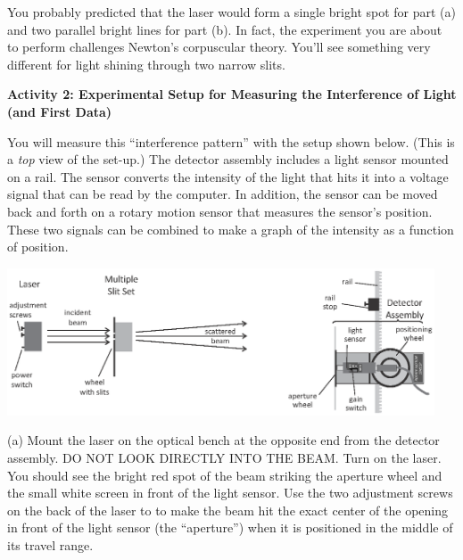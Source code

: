 You probably predicted that the laser would
form a single bright spot for part (a) and two parallel bright lines for part
(b).  In fact, the experiment you are about to perform challenges Newton's corpuscular theory. 
You'll see something very different for light shining through two narrow slits.


\textbf{Activity 2: Experimental Setup for Measuring the Interference of Light (and First Data)}

You will measure this ``interference pattern'' with the setup shown below. 
(This is a \textit{top} view of the set-up.) 
The detector assembly includes a light sensor mounted on a rail. The sensor converts the intensity 
of the light that hits it into a voltage signal that can be read by the
computer. In addition, the sensor can be moved back and
forth on a rotary motion sensor that measures the sensor's position. These two signals can be combined to
make a graph of the intensity as a function of position.

{\centering \includegraphics[width=0.95\textwidth]{interference_of_light/apparatus.eps} \par}
\label{figure_rail_stop}

(a) Mount the laser on the 
optical bench at the opposite end from the detector assembly.
DO NOT LOOK DIRECTLY INTO
THE BEAM.  Turn on the
laser.  You should see the bright red spot of the beam striking
the aperture wheel and the small white screen in front of the light sensor. 
Use the two adjustment screws on the back of the laser to to make the beam hit the exact center of the opening in front of the light sensor (the ``aperture'') when it is positioned in the middle of its travel range.  


